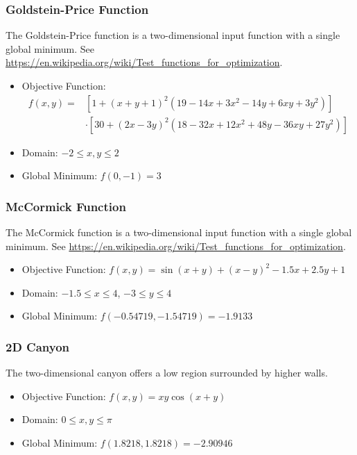 \subsubsection{Goldstein-Price Function}
The Goldstein-Price function is a two-dimensional input function with a single global minimum.
See \url{https://en.wikipedia.org/wiki/Test_functions_for_optimization}.

\begin{itemize}
  \item Objective Function:
    \begin{align}
      f(x,y) =& \left[1+(x+y+1)^2\left(19-14x+3x^2-14y+6xy+3y^2\right)\right] \\ \nonumber
        & \cdot\left[30+(2x-3y)^2(18-32x+12x^2+48y-36xy+27y^2)\right]
    \end{align}
  \item Domain: $-2 \leq x,y \leq 2$
  \item Global Minimum: $f(0,-1)=3$
\end{itemize}

\subsubsection{McCormick Function}
The McCormick function is a two-dimensional input function with a single global minimum.
See \url{https://en.wikipedia.org/wiki/Test_functions_for_optimization}.

\begin{itemize}
  \item Objective Function: $f(x,y) = \sin(x+y) + (x-y)^2 - 1.5x + 2.5y + 1$
  \item Domain: $-1.5 \leq x \leq 4$, $-3 \leq y \leq 4$
  \item Global Minimum: $f(-0.54719,-1.54719) = -1.9133$
\end{itemize}

\subsubsection{2D Canyon}
The two-dimensional canyon offers a low region surrounded by higher walls.

\begin{itemize}
  \item Objective Function: $f(x,y) = xy\cos(x+y)$
  \item Domain: $0 \leq x,y \leq \pi$
  \item Global Minimum: $f(1.8218,1.8218)=-2.90946$
\end{itemize}

